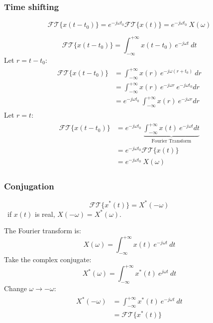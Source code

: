 \subsubsection{Time shifting}
\[ \mathcal{FT} \{ x(t-t_{0}) \} = e^{-j \omega t_{0}}\mathcal{FT} \{ x(t)\} = e^{-j \omega t_{0}} \ X(\omega) \]
\begin{dv}{}
    \[ \mathcal{FT} \{ x(t-t_{0}) \} =  \int_{-\infty}^{+\infty} x(t-t_{0}) \ e^{-j \omega t} \ dt\] 
    Let $r = t - t_{0}$:
    \begin{align*}
    \begin{split}
        \mathcal{FT} \{ x(t-t_{0}) \} &=  \int_{-\infty}^{+\infty} x(r) \ e^{-j \omega (r+t_{0})} \ dr\\
        &= \int_{-\infty}^{+\infty} x(r) \ e^{-j \omega r} \ e^{-j \omega t_{0}} dr \\
        &= e^{-j \omega t_{0}} \ \int_{-\infty}^{+\infty} x(r) \ e^{-j \omega r}dr 
    \end{split} 
    \end{align*}
    Let $r = t$:
    \begin{align*}
    \begin{split}
        \mathcal{FT} \{ x(t-t_{0}) \} &= e^{-j \omega t_{0}} \ \underbrace{\int_{-\infty}^{+\infty} x(t) \ e^{-j \omega t} dt}_{\text{Fourier Transform}}\\
        & = e^{-j \omega t_{0}}\mathcal{FT} \{ x(t)\}\\
        &=e^{-j \omega t_{0}} \ X(\omega)
    \end{split} 
    \end{align*}
\end{dv}

\subsubsection{Conjugation}
\[ \mathcal{FT} \{ x^{*}(t)\} = X^{*}(-\omega) \]
\ if $x(t)$ is real, $X(-\omega) = X^{*}(\omega)$.
\begin{dv}{}
    The Fourier transform is:
    \[ X(\omega) =  \int_{-\infty}^{+\infty} x(t) \ e^{-j \omega t} \ dt\] 
    Take the complex conjugate:
    \[ X^{*}(\omega) =  \int_{-\infty}^{+\infty} x^{*}(t) \ e^{j \omega t} \ dt\] 
    Change $\omega \to -\omega$:
    \begin{align*}
    \begin{split} 
        X^{*}(-\omega) &=  \int_{-\infty}^{+\infty} x^{*}(t) \ e^{-j \omega t} \ dt\\
        &= \mathcal{FT}\{ x^{*}(t)\}
    \end{split} 
    \end{align*}
\end{dv}


